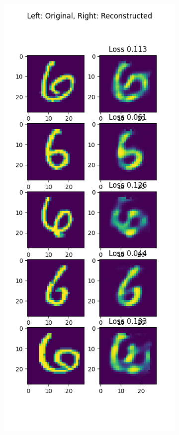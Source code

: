 \begin{solve}
\begin{figure}[H]
\begin{subfigure}{.5\textwidth}
    \end{subfigure}
    \end{figure}
    \begin{figure}[H]
    \begin{subfigure}{.5\textwidth}
        \centering
        \includegraphics[width=.9\linewidth]{plots/output_6.png}

\end{subfigure}
\end{figure}
\end{solve}
